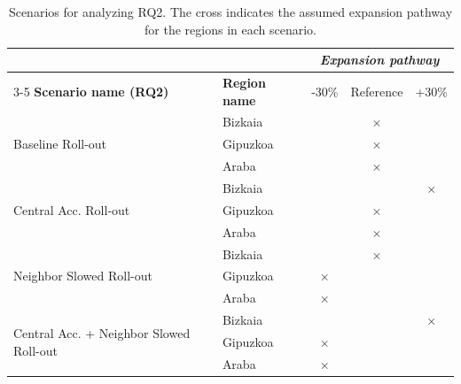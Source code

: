        \begin{table}[H]
\centering
\caption{Scenarios for analyzing RQ2. The cross indicates the assumed expansion pathway for the regions in each scenario.}
\label{tab:expansion_speed}
\begin{tabular}{llccc}
\hline
                                                         &                      & \multicolumn{3}{c}{\textit{\textbf{Expansion pathway}}} \\ \cline{3-5} 
\textbf{Scenario name (RQ2)}                             & \textbf{Region name} & -30\%            & Reference         & +30\%            \\ \hline
\multirow{3}{*}{Baseline Roll-out}                       & Bizkaia              &                  & $\times$          &                  \\             
                                                         & Gipuzkoa             &                  & $\times$          &                  \\
                                                         & Araba                &                  & $\times$          &                \\ \hline
\multirow{3}{*}{Central Acc. Roll-out}                   & Bizkaia              &                  &                   & $\times$         \\ 
                                                         & Gipuzkoa             &                  & $\times$          &                  \\
                                                         & Araba                &                  & $\times$          &                  \\ \hline
\multirow{3}{*}{Neighbor Slowed Roll-out}                & Bizkaia                &          &  $\times$                  &                  \\
                                                         & Gipuzkoa             & $\times$         &                   &                  \\
                                                         & Araba              & $\times$                 &          &                  \\ \hline
\multirow{3}{*}{Central Acc. + Neighbor Slowed Roll-out} & Bizkaia                 &         &                   &    $\times$              \\
                                                         & Gipuzkoa             & $\times$         &                   &                  \\
                                                         & Araba             & $\times$                  &                   &          \\ \hline
\end{tabular}
\end{table}
